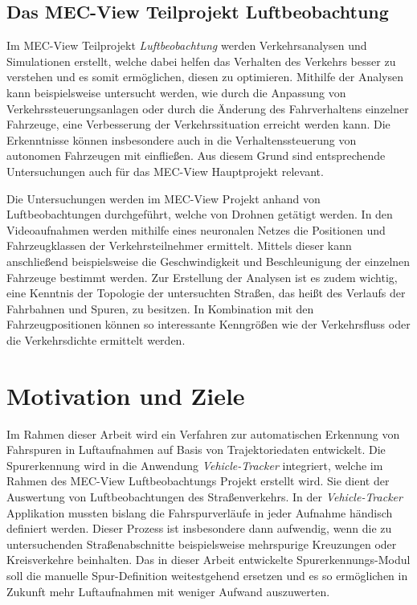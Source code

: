 \subsection{Das MEC-View Teilprojekt Luftbeobachtung}
\label{sec:mecview_sim}

Im MEC-View Teilprojekt \textit{Luftbeobachtung} werden Verkehrsanalysen und Simulationen erstellt, welche dabei helfen
das Verhalten des Verkehrs besser zu verstehen und es somit ermöglichen, diesen zu optimieren.
Mithilfe der Analysen kann beispielsweise untersucht werden, wie durch die Anpassung von Verkehrssteuerungsanlagen
oder durch die Änderung des Fahrverhaltens einzelner Fahrzeuge, eine Verbesserung der Verkehrssituation erreicht werden kann.
Die Erkenntnisse können insbesondere auch in die Verhaltenssteuerung von autonomen Fahrzeugen mit einfließen.
Aus diesem Grund sind entsprechende Untersuchungen auch für das MEC-View Hauptprojekt relevant.

Die Untersuchungen werden im MEC-View Projekt anhand von Luftbeobachtungen durchgeführt, welche von Drohnen getätigt werden.
In den Videoaufnahmen werden mithilfe eines neuronalen Netzes die Positionen und Fahrzeugklassen der Verkehrsteilnehmer ermittelt.
Mittels dieser kann anschließend beispielsweise die Geschwindigkeit und Beschleunigung der einzelnen Fahrzeuge bestimmt werden.
Zur Erstellung der Analysen ist es zudem wichtig, eine Kenntnis der Topologie der untersuchten Straßen, das heißt des
Verlaufs der Fahrbahnen und Spuren, zu besitzen. In Kombination mit den Fahrzeugpositionen können so interessante
Kenngrößen wie der Verkehrsfluss oder die Verkehrsdichte ermittelt werden.

\section{Motivation und Ziele}
\label{sec:motivation_goals}

Im Rahmen dieser Arbeit wird ein Verfahren zur automatischen Erkennung von Fahrspuren in Luftaufnahmen
auf Basis von Trajektoriedaten entwickelt. Die Spurerkennung wird in die Anwendung \textit{Vehicle-Tracker}
integriert, welche im Rahmen des MEC-View Luftbeobachtungs Projekt erstellt wird. Sie dient der Auswertung
von Luftbeobachtungen des Straßenverkehrs.
In der \textit{Vehicle-Tracker} Applikation mussten bislang die Fahrspurverläufe in jeder Aufnahme
händisch definiert werden. Dieser Prozess ist insbesondere dann aufwendig, wenn die zu untersuchenden
Straßenabschnitte beispielsweise mehrspurige Kreuzungen oder Kreisverkehre beinhalten. Das in dieser Arbeit
entwickelte Spurerkennungs-Modul soll die manuelle Spur-Definition weitestgehend ersetzen und es so ermöglichen
in Zukunft mehr Luftaufnahmen mit weniger Aufwand auszuwerten.

